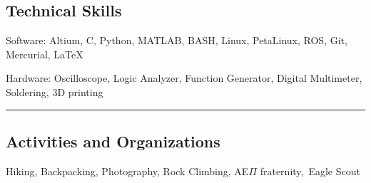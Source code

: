 \documentclass[10pt,letterpaper]{article}
\newenvironment{indentsection}[1]%
{\begin{list}{}%
	{\setlength{\leftmargin}{#1}}%
	\item[]%
}
{\end{list}}
\begin{document}
\subsection*{Technical Skills}

\begin{description*}
	\item[Software:]
	 Altium, C, Python, MATLAB, BASH, Linux, PetaLinux, ROS, Git, Mercurial, \LaTeX
	\item[Hardware:]
	Oscilloscope, Logic Analyzer, Function Generator, Digital Multimeter, Soldering, 3D printing
\end{description*}

\hrule
\vspace{-0.4em}
\subsection*{Activities and Organizations}
\indent Hiking, Backpacking, Photography, Rock Climbing, AE$\Pi$ fraternity,\, Eagle Scout
\end{document}

